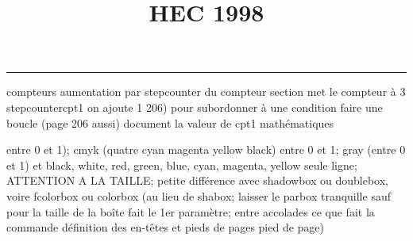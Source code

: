 \documentclass[11pt]{article}%
\title{\bf \vspace{-1cm} HEC 1998} %
\author{} %
\date{} %
\renewcommand{\headrulewidth}{0pt}%
\renewcommand{\footrulewidth}{0.4pt}%
\begin{document}
\maketitle %
\vspace{-1.2cm}\hrule %
\thispagestyle{fancy}

\vspace*{.4cm}


compteurs%
aumentation par stepcounter du compteur section%
met le compteur à 3%
stepcounter{cpt1} on ajoute 1%
206) pour subordonner à une condition %
faire une boucle (page 206 aussi) %
document la valeur de cpt1 
mathématiques\newcommand{\ch}{\operatorname{ch}} 
\newcommand{\sh}{\operatorname{sh}}
\renewcommand{\tanh}{\operatorname{th}}
\renewcommand{\sinh}{\operatorname{sh}}
\renewcommand{\cosh}{\operatorname{ch}}
\newcommand{\argsh}{\operatorname{argsh}}
\newcommand{\argch}{\operatorname{argch}}
\newcommand{\argth}{\operatorname{argth}}
\newcommand{\Id}{\operatorname{Id}}
\renewcommand{\leq}{\leq}
\renewcommand{\geq}{\geq }

\newcommand{\dlim}{\lim}
\newcommand{\dsum}{\sum}
\newcommand{\dprod}{\prod}



entre 0 et 1); cmyk (quatre cyan magenta yellow black) entre 0 et 1;
gray (entre 0 et 1) et black, white, red, green, blue, cyan, magenta,
yellow%
seule ligne; ATTENTION A LA TAILLE; petite différence avec shadowbox ou
doublebox, voire fcolorbox ou colorbox (au lieu de shabox; laisser le
parbox tranquille sauf pour la taille de la boîte
\newcommand{\Tbox}[1]{\begin{center} \shabox{\parbox{0.6
\linewidth}{#1}} \end{center}} %
fait le 1er paramètre; entre accolades ce que fait la commande
définition des en-têtes et pieds de pages\pagestyle{fancy}
\chead{}
\rfoot[ \ \thepage]{\thepage}
\cfoot{}
\lfoot{}
\thispagestyle{fancy} %
pied de page)\renewcommand{\footrulewidth}{0.4pt}
\renewcommand{\headrulewidth}{0.4pt}
\end{document}
